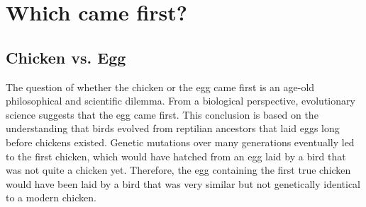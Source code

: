 \section{Which came first?}

\subsection{Chicken vs. Egg}

The question of whether the chicken or the egg came first is an age-old philosophical and scientific dilemma.
From a biological perspective, evolutionary science suggests that the egg came first.
This conclusion is based on the understanding that birds evolved from reptilian ancestors that laid eggs long before chickens existed.
Genetic mutations over many generations eventually led to the first chicken, which would have hatched from an egg laid by a bird that was not quite a chicken yet.
Therefore, the egg containing the first true chicken would have been laid by a bird that was very similar but not genetically identical to a modern chicken.